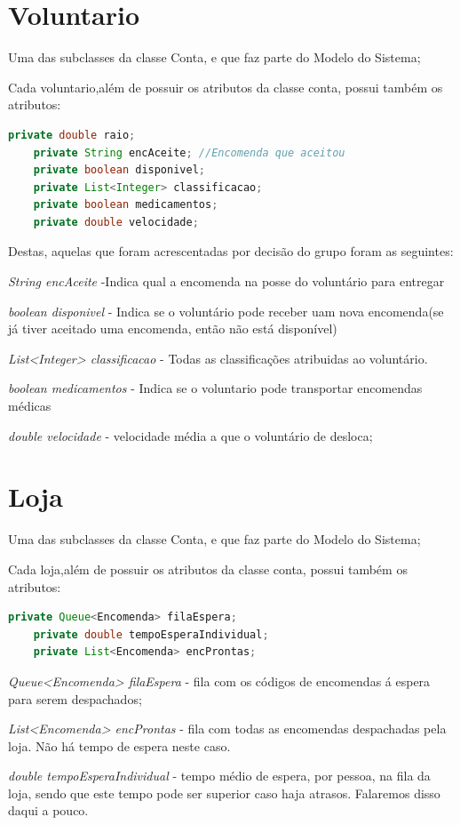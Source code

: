 \documentclass[a4paper]{report}
\begin{document}
	
	\section{Voluntario}
	Uma das subclasses da classe Conta, e que faz parte do Modelo do Sistema;
	
	Cada voluntario,além de possuir os atributos da classe conta, possui também os atributos:
	\begin{lstlisting}[language=Java]
	private double raio;
	private String encAceite; //Encomenda que aceitou
	private boolean disponivel;
	private List<Integer> classificacao;
	private boolean medicamentos;
	private double velocidade; 
	\end{lstlisting}
	Destas, aquelas que foram acrescentadas por decisão do grupo foram as seguintes:
 	
\textit{String encAceite} -Indica qual a encomenda na posse do voluntário para entregar

\textit{boolean disponivel}  - Indica se o voluntário pode receber uam nova encomenda(se já tiver aceitado uma encomenda, então não está disponível)

\textit{List<Integer> classificacao} - Todas as classificações atribuidas ao voluntário.

\textit{boolean medicamentos} - Indica se o voluntario pode transportar encomendas médicas

\textit{double velocidade} - velocidade média a que o voluntário de desloca;
	
	\section{Loja}
	Uma das subclasses da classe Conta, e que faz parte do Modelo do Sistema;
	
	Cada loja,além de possuir os atributos da classe conta, possui também os atributos:
	\begin{lstlisting}[language=Java]
	private Queue<Encomenda> filaEspera;
	private double tempoEsperaIndividual;
	private List<Encomenda> encProntas;
	\end{lstlisting}
	\textit{Queue<Encomenda> filaEspera} - fila com os códigos de encomendas á espera para serem despachados; 
	
	\textit{ List<Encomenda> encProntas} - fila com todas as encomendas despachadas pela loja. Não há tempo de espera neste caso.
	
	\textit{ double tempoEsperaIndividual} - tempo médio de espera, por pessoa, na fila da loja, sendo que este tempo pode ser superior caso haja atrasos. Falaremos disso daqui a pouco.
	
\end{document}
